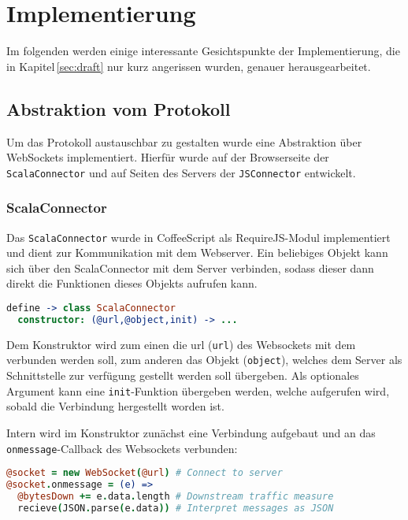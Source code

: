 \chapter{Implementierung}
\label{sec:imp}

Im folgenden werden einige interessante Gesichtspunkte der Implementierung, die in
Kapitel\,\ref{sec:draft} nur kurz angerissen wurden, genauer herausgearbeitet.

\section{Abstraktion vom Protokoll}
\label{sec:jsc}

Um das Protokoll austauschbar zu gestalten wurde eine Abstraktion über WebSockets implementiert.
Hierfür wurde auf der Browserseite der \texttt{ScalaConnector} und auf Seiten des Servers der
\texttt{JSConnector} entwickelt.

\subsection{ScalaConnector}

Das \texttt{ScalaConnector} wurde in CoffeeScript als RequireJS-Modul implementiert und dient zur
Kommunikation mit dem Webserver. Ein beliebiges Objekt kann sich über den ScalaConnector mit dem
Server verbinden, sodass dieser dann direkt die Funktionen dieses Objekts aufrufen kann.

\begin{lstlisting}[language=coffee]
define -> class ScalaConnector
  constructor: (@url,@object,init) -> ...
\end{lstlisting}

Dem Konstruktor wird zum einen die url (\texttt{url}) des Websockets mit dem verbunden werden soll,
zum anderen das Objekt (\texttt{object}), welches dem Server als Schnittstelle zur verfügung
gestellt werden soll übergeben. Als optionales Argument kann eine \texttt{init}-Funktion übergeben
werden, welche aufgerufen wird, sobald die Verbindung hergestellt worden ist.

Intern wird im Konstruktor zunächst eine Verbindung aufgebaut und an das
\texttt{onmessage}-Callback des Websockets verbunden:

\begin{lstlisting}[language=coffee]
@socket = new WebSocket(@url) # Connect to server
@socket.onmessage = (e) =>    
  @bytesDown += e.data.length # Downstream traffic measure
  recieve(JSON.parse(e.data)) # Interpret messages as JSON
\end{lstlisting}

